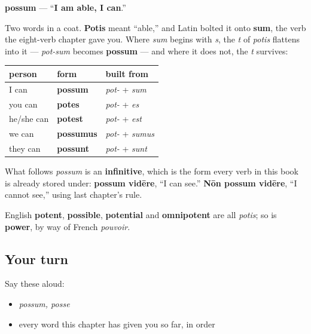 \begin{cousinweb}
\textbf{possum} — \textquotedblleft{}\textbf{I am able, I can}.\textquotedblright{}

Two words in a coat. \textbf{Potis} meant \textquotedblleft{}able,\textquotedblright{} and Latin bolted it onto \textbf{sum}, the verb the eight-verb chapter gave you. Where \emph{sum} begins with \emph{s}, the \emph{t} of \emph{potis} flattens into it — \emph{pot-sum} becomes \textbf{possum} — and where it does not, the \emph{t} survives:

\noindent
\begin{tabularx}{\linewidth}{@{}>{\raggedright\arraybackslash}X>{\raggedright\arraybackslash}X>{\raggedright\arraybackslash}X@{}}
\toprule
\textbf{person} & \textbf{form} & \textbf{built from} \\
\midrule
I can & \textbf{possum} & \emph{pot-} + \emph{sum} \\
you can & \textbf{potes} & \emph{pot-} + \emph{es} \\
he/she can & \textbf{potest} & \emph{pot-} + \emph{est} \\
we can & \textbf{possumus} & \emph{pot-} + \emph{sumus} \\
they can & \textbf{possunt} & \emph{pot-} + \emph{sunt} \\
\bottomrule
\end{tabularx}

What follows \emph{possum} is an \textbf{infinitive}, which is the form every verb in this book is already stored under: \textbf{possum vidēre}, \textquotedblleft{}I can see.\textquotedblright{} \textbf{Nōn possum vidēre}, \textquotedblleft{}I cannot see,\textquotedblright{} using last chapter's rule.

English \textbf{potent}, \textbf{possible}, \textbf{potential} and \textbf{omnipotent} are all \emph{potis}; so is \textbf{power}, by way of French \emph{pouvoir}.
\end{cousinweb}

\subsection*{Your turn}
Say these aloud:

\begin{itemize}
\raggedright
  \item \emph{possum, posse}
  \item every word this chapter has given you so far, in order
\end{itemize}

